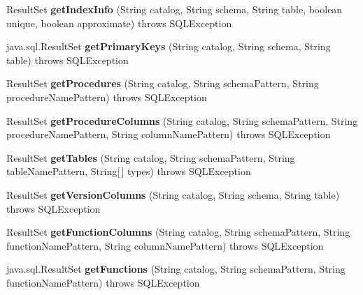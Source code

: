 \begin{DoxyCompactItemize}
Result\+Set {\bfseries get\+Index\+Info} (String catalog, String schema, String table, boolean unique, boolean approximate)  throws S\+Q\+L\+Exception 
\item 
\mbox{\label{classcom_1_1mysql_1_1cj_1_1jdbc_1_1_database_meta_data_using_info_schema_a1f0bdccd4ada6003df046679671db018}} 
java.\+sql.\+Result\+Set {\bfseries get\+Primary\+Keys} (String catalog, String schema, String table)  throws S\+Q\+L\+Exception 
\item 
\mbox{\label{classcom_1_1mysql_1_1cj_1_1jdbc_1_1_database_meta_data_using_info_schema_aa11c57b668f3faec0d47c227012ab3d5}} 
Result\+Set {\bfseries get\+Procedures} (String catalog, String schema\+Pattern, String procedure\+Name\+Pattern)  throws S\+Q\+L\+Exception 
\item 
\mbox{\label{classcom_1_1mysql_1_1cj_1_1jdbc_1_1_database_meta_data_using_info_schema_a74c529202d0ddf513d25beac132695aa}} 
Result\+Set {\bfseries get\+Procedure\+Columns} (String catalog, String schema\+Pattern, String procedure\+Name\+Pattern, String column\+Name\+Pattern)  throws S\+Q\+L\+Exception 
\item 
\mbox{\label{classcom_1_1mysql_1_1cj_1_1jdbc_1_1_database_meta_data_using_info_schema_a8143a33c43143799bb83a33188127cf8}} 
Result\+Set {\bfseries get\+Tables} (String catalog, String schema\+Pattern, String table\+Name\+Pattern, String\mbox{[}$\,$\mbox{]} types)  throws S\+Q\+L\+Exception 
\item 
\mbox{\label{classcom_1_1mysql_1_1cj_1_1jdbc_1_1_database_meta_data_using_info_schema_aa112f9dc4025c1dd6b4c0ec2b85f7ede}} 
Result\+Set {\bfseries get\+Version\+Columns} (String catalog, String schema, String table)  throws S\+Q\+L\+Exception 
\item 
\mbox{\label{classcom_1_1mysql_1_1cj_1_1jdbc_1_1_database_meta_data_using_info_schema_ac2eee77f25061dbaa99451a0dbb81c02}} 
Result\+Set {\bfseries get\+Function\+Columns} (String catalog, String schema\+Pattern, String function\+Name\+Pattern, String column\+Name\+Pattern)  throws S\+Q\+L\+Exception 
\item 
\mbox{\label{classcom_1_1mysql_1_1cj_1_1jdbc_1_1_database_meta_data_using_info_schema_a51fdb9a66180fac6cc0c2bfbb57849e3}} 
java.\+sql.\+Result\+Set {\bfseries get\+Functions} (String catalog, String schema\+Pattern, String function\+Name\+Pattern)  throws S\+Q\+L\+Exception 
\end{DoxyCompactItemize}

